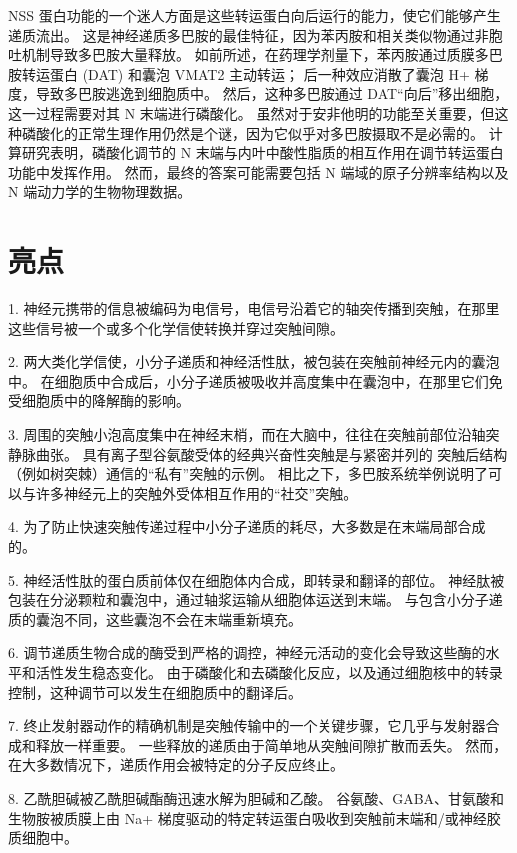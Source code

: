 NSS 蛋白功能的一个迷人方面是这些转运蛋白向后运行的能力，使它们能够产生递质流出。
这是神经递质多巴胺的最佳特征，因为苯丙胺和相关类似物通过非胞吐机制导致多巴胺大量释放。
如前所述，在药理学剂量下，苯丙胺通过质膜多巴胺转运蛋白 (DAT) 和囊泡 VMAT2 主动转运；
后一种效应消散了囊泡 H+ 梯度，导致多巴胺逃逸到细胞质中。
然后，这种多巴胺通过 DAT“向后”移出细胞，这一过程需要对其 N 末端进行磷酸化。
虽然对于安非他明的功能至关重要，但这种磷酸化的正常生理作用仍然是个谜，因为它似乎对多巴胺摄取不是必需的。
计算研究表明，磷酸化调节的 N 末端与内叶中酸性脂质的相互作用在调节转运蛋白功能中发挥作用。
然而，最终的答案可能需要包括 N 端域的原子分辨率结构以及 N 端动力学的生物物理数据。



\section{亮点}

1. 神经元携带的信息被编码为电信号，电信号沿着它的轴突传播到突触，在那里这些信号被一个或多个化学信使转换并穿过突触间隙。 


2. 两大类化学信使，小分子递质和神经活性肽，被包装在突触前神经元内的囊泡中。
在细胞质中合成后，小分子递质被吸收并高度集中在囊泡中，在那里它们免受细胞质中的降解酶的影响。 


3. 周围的突触小泡高度集中在神经末梢，而在大脑中，往往在突触前部位沿轴突静脉曲张。
具有离子型谷氨酸受体的经典兴奋性突触是与紧密并列的
突触后结构（例如树突棘）通信的“私有”突触的示例。 相比之下，多巴胺系统举例说明了可以与许多神经元上的突触外受体相互作用的“社交”突触。


4. 为了防止快速突触传递过程中小分子递质的耗尽，大多数是在末端局部合成的。


5. 神经活性肽的蛋白质前体仅在细胞体内合成，即转录和翻译的部位。
神经肽被包装在分泌颗粒和囊泡中，通过轴浆运输从细胞体运送到末端。
与包含小分子递质的囊泡不同，这些囊泡不会在末端重新填充。 


6. 调节递质生物合成的酶受到严格的调控，神经元活动的变化会导致这些酶的水平和活性发生稳态变化。
由于磷酸化和去磷酸化反应，以及通过细胞核中的转录控制，这种调节可以发生在细胞质中的翻译后。 


7. 终止发射器动作的精确机制是突触传输中的一个关键步骤，它几乎与发射器合成和释放一样重要。
一些释放的递质由于简单地从突触间隙扩散而丢失。
然而，在大多数情况下，递质作用会被特定的分子反应终止。 


8. 乙酰胆碱被乙酰胆碱酯酶迅速水解为胆碱和乙酸。
谷氨酸、GABA、甘氨酸和生物胺被质膜上由 Na+ 梯度驱动的特定转运蛋白吸收到突触前末端和/或神经胶质细胞中。 


